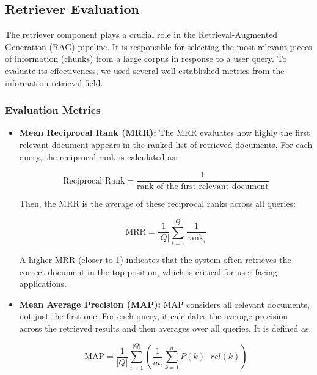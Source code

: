 \subsection{Retriever Evaluation}
\label{subsec:retriever-eval}

The retriever component plays a crucial role in the Retrieval-Augmented Generation (RAG) pipeline. It is responsible for selecting the most relevant pieces of information (chunks) from a large corpus in response to a user query. To evaluate its effectiveness, we used several well-established metrics from the information retrieval field.

\subsubsection{Evaluation Metrics}
\begin{itemize}
    \item \textbf{Mean Reciprocal Rank (MRR):}
    The MRR evaluates how highly the first relevant document appears in the ranked list of retrieved documents. For each query, the reciprocal rank is calculated as:
    
    \begin{equation*}
    \text{Reciprocal Rank} = \frac{1}{\text{rank of the first relevant document}}
    \end{equation*}
    
    Then, the MRR is the average of these reciprocal ranks across all queries:
    
    \begin{equation*}
    \text{MRR} = \frac{1}{|Q|} \sum_{i=1}^{|Q|} \frac{1}{\text{rank}_i}
    \end{equation*}
    
    A higher MRR (closer to 1) indicates that the system often retrieves the correct document in the top position, which is critical for user-facing applications.

    \item \textbf{Mean Average Precision (MAP):}
    MAP considers all relevant documents, not just the first one. For each query, it calculates the average precision across the retrieved results and then averages over all queries. It is defined as:
    
    \begin{equation*}
    \text{MAP} = \frac{1}{|Q|} \sum_{i=1}^{|Q|} \left( \frac{1}{m_i} \sum_{k=1}^{n} P(k) \cdot rel(k) \right)
    \end{equation*}
    

\end{itemize}

